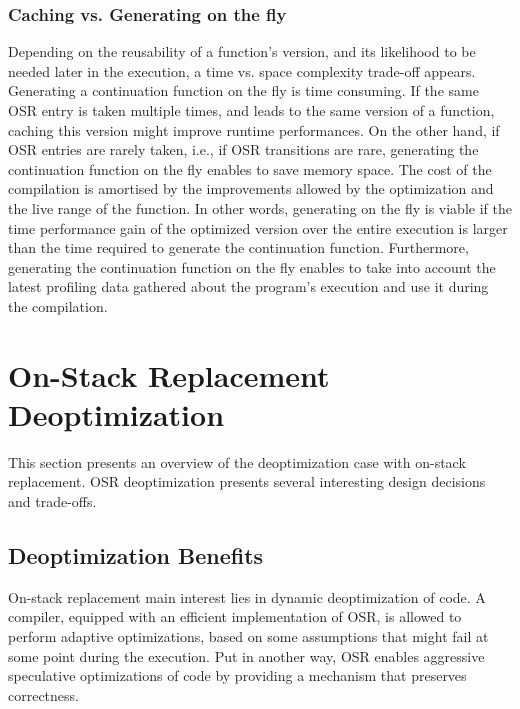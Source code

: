 \subsubsection{Caching vs. Generating on the fly}

Depending on the reusability of a function's version, and its likelihood to be needed later in the execution, a time vs. space complexity trade-off appears.
Generating a continuation function on the fly is time consuming.
If the same OSR entry is taken multiple times, and leads to the same version of a function, caching this version might improve runtime performances.
On the other hand, if OSR entries are rarely taken, i.e., if OSR transitions are rare, generating the continuation function on the fly enables to save memory space. 
The cost of the compilation is amortised by the improvements allowed by the optimization and the live range of the function. 
In other words, generating on the fly is viable if the time performance gain of the optimized version over the entire execution is larger than the time required to generate the continuation function.
Furthermore, generating the continuation function on the fly enables to take into account the latest profiling data gathered about the program's execution and use it during the compilation.\\


\section{On-Stack Replacement Deoptimization}
This section presents an overview of the deoptimization case with on-stack replacement.
OSR deoptimization presents several interesting design decisions and trade-offs.

\subsection{Deoptimization Benefits}\label{WhyDeopt}
On-stack replacement main interest lies in dynamic deoptimization of code.
A compiler, equipped with an efficient implementation of OSR, is allowed to perform adaptive optimizations, based on some assumptions that might fail at some point during the execution.
Put in another way, OSR enables aggressive speculative optimizations of code by providing a mechanism that preserves correctness.\\

